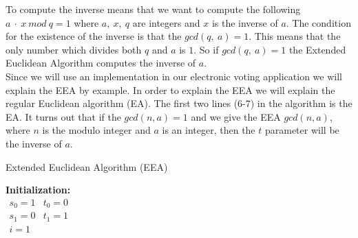  To compute the inverse means that we want to compute the following \begin{math}a\ \cdot \ x \ mod \ q = 1 \end{math} where $a, \ x, \ q$ are integers and $x$ is the inverse of $a$. The condition for the existence of the inverse is that the $gcd(q,\ a)= 1$. This means that the only number which divides both $q$ and $a$ is $1$. So if $gcd(q,\ a)= 1$ the Extended Euclidean Algorithm computes the inverse of $a$.\\


 Since we will use an implementation in our electronic voting application we will explain the EEA by example. In order to explain the EEA we will explain the regular Euclidean algorithm (EA). The first two lines (6-7) in the algorithm is the EA. It turns out that if the $gcd(n,a)=1$  and we give the EEA $gcd(n,a)$, where $n$ is the modulo integer and $a$ is an integer, then the $t$ parameter will be the inverse of $a$. 
\cite{Paar}

\begin{center}
\begin{algorithm}[H]
\caption{Extended Euclidean Algorithm (EEA)\label{alg}}



\textbf{Initialization:} \\
$
\begin{array}{ll}
    s_0 = 1   & t_0 = 0 \\
    s_1 = 0   & t_1 = 1 \\
      i = 1     &           \\
\end{array}                 
$

\end{algorithm}
\end{center}


